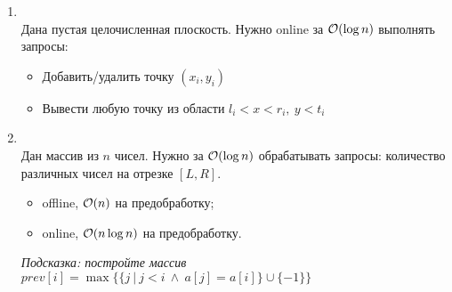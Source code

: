 \begin{enumerate}
  \item {}\\
    Дана пустая целочисленная плоскость. Нужно online за $\mathcal{O}(\log n)$ выполнять запросы:
    \begin{itemize}
      \item Добавить/удалить точку $(x_i, y_i)$
      \item Вывести любую точку из области $l_i < x < r_i,~ y < t_i$
    \end{itemize}

  \item {}\\
    Дан массив из $n$ чисел. Нужно за $\mathcal{O}(\log n)$ обрабатывать запросы: количество
    различных чисел на отрезке $[L, R]$.
        \begin{itemize}
            \item offline, $\mathcal{O}(n)$ на предобработку;
            \item online, $\mathcal{O}(n \log n)$ на предобработку.
        \end{itemize}
    \emph{Подсказка: постройте массив $prev[i] = \max \Big\lbrace \{ j ~|~ j < i ~\land~ a[j] = a[i] \} \cup \{-1\} \Big\rbrace$}




\end{enumerate}
